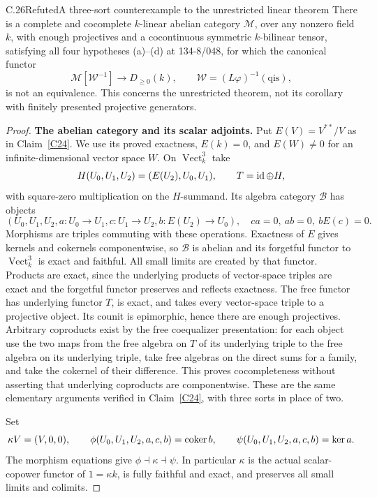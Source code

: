 \begin{claim}{C.26}{Refuted}{A three-sort counterexample to the unrestricted linear theorem}\label{C26}
There is a complete and cocomplete $k$-linear abelian category $\mathcal M$, over any nonzero field $k$, with enough projectives and a cocontinuous symmetric $k$-bilinear tensor, satisfying all four hypotheses (a)--(d) at 134-8/048, for which the canonical functor
\[
\mathcal M[\mathcal W^{-1}]\longrightarrow D_{\geq0}(k),
\qquad \mathcal W=(L\varphi)^{-1}(\mathrm{qis}),
\]
is not an equivalence. This concerns the unrestricted theorem, not its corollary with finitely presented projective generators.
\end{claim}
\begin{proof}
\textbf{The abelian category and its scalar adjoints.}
Put $E(V)=V^{**}/V$ as in Claim~\ref{C24}. We use its proved exactness, $E(k)=0$, and $E(W)\ne0$ for an infinite-dimensional vector space $W$. On $\operatorname{Vect}_k^3$ take
\[
H(U_0,U_1,U_2)=(E(U_2),U_0,U_1),\qquad T=\operatorname{id}\oplus H,
\]
with square-zero multiplication on the $H$-summand. Its algebra category $\mathcal B$ has objects
\[
(U_0,U_1,U_2,a:U_0\to U_1,c:U_1\to U_2,b:E(U_2)\to U_0),
\quad ca=0,\ ab=0,\ bE(c)=0.
\]
Morphisms are triples commuting with these operations. Exactness of $E$ gives kernels and cokernels componentwise, so $\mathcal B$ is abelian and its forgetful functor to $\operatorname{Vect}_k^3$ is exact and faithful. All small limits are created by that functor. Products are exact, since the underlying products of vector-space triples are exact and the forgetful functor preserves and reflects exactness. The free functor has underlying functor $T$, is exact, and takes every vector-space triple to a projective object. Its counit is epimorphic, hence there are enough projectives. Arbitrary coproducts exist by the free coequalizer presentation: for each object use the two maps from the free algebra on $T$ of its underlying triple to the free algebra on its underlying triple, take free algebras on the direct sums for a family, and take the cokernel of their difference. This proves cocompleteness without asserting that underlying coproducts are componentwise. These are the same elementary arguments verified in Claim~\ref{C24}, with three sorts in place of two.

Set
\[
\kappa V=(V,0,0),\qquad
\phi(U_0,U_1,U_2,a,c,b)=\operatorname{coker} b,\qquad
\psi(U_0,U_1,U_2,a,c,b)=\ker a.
\]
The morphism equations give $\phi\dashv\kappa\dashv\psi$. In particular $\kappa$ is the actual scalar-copower functor of $1=\kappa k$, is fully faithful and exact, and preserves all small limits and colimits.


\end{proof}
